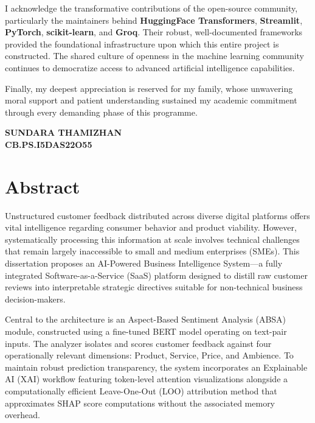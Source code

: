 \documentclass[12pt,a4paper]{report}
\begin{document}
I acknowledge the transformative contributions of the open-source community, particularly the maintainers behind \textbf{HuggingFace Transformers}, \textbf{Streamlit}, \textbf{PyTorch}, \textbf{scikit-learn}, and \textbf{Groq}. Their robust, well-documented frameworks provided the foundational infrastructure upon which this entire project is constructed. The shared culture of openness in the machine learning community continues to democratize access to advanced artificial intelligence capabilities.

Finally, my deepest appreciation is reserved for my family, whose unwavering moral support and patient understanding sustained my academic commitment through every demanding phase of this programme.

\vspace{2cm}
\begin{flushright}
\textbf{SUNDARA THAMIZHAN}\\
\textbf{CB.PS.I5DAS22O55}
\end{flushright}

\newpage
\chapter*{Abstract}

Unstructured customer feedback distributed across diverse digital platforms offers vital intelligence regarding consumer behavior and product viability. However, systematically processing this information at scale involves technical challenges that remain largely inaccessible to small and medium enterprises (SMEs). This dissertation proposes an AI-Powered Business Intelligence System—a fully integrated Software-as-a-Service (SaaS) platform designed to distill raw customer reviews into interpretable strategic directives suitable for non-technical business decision-makers.

Central to the architecture is an Aspect-Based Sentiment Analysis (ABSA) module, constructed using a fine-tuned BERT model operating on text-pair inputs. The analyzer isolates and scores customer feedback against four operationally relevant dimensions: Product, Service, Price, and Ambience. To maintain robust prediction transparency, the system incorporates an Explainable AI (XAI) workflow featuring token-level attention visualizations alongside a computationally efficient Leave-One-Out (LOO) attribution method that approximates SHAP score computations without the associated memory overhead.
\end{document}
